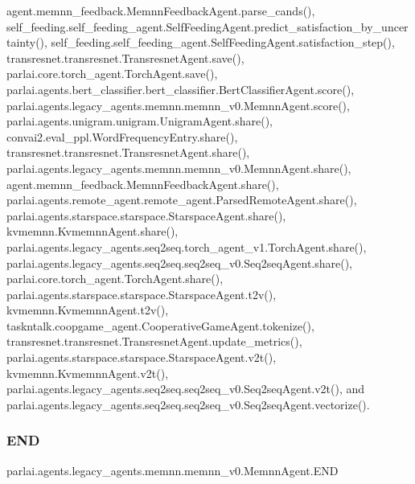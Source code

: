 agent.\+memnn\+\_\+feedback.\+Memnn\+Feedback\+Agent.\+parse\+\_\+cands(), self\+\_\+feeding.\+self\+\_\+feeding\+\_\+agent.\+Self\+Feeding\+Agent.\+predict\+\_\+satisfaction\+\_\+by\+\_\+uncertainty(), self\+\_\+feeding.\+self\+\_\+feeding\+\_\+agent.\+Self\+Feeding\+Agent.\+satisfaction\+\_\+step(), transresnet.\+transresnet.\+Transresnet\+Agent.\+save(), parlai.\+core.\+torch\+\_\+agent.\+Torch\+Agent.\+save(), parlai.\+agents.\+bert\+\_\+classifier.\+bert\+\_\+classifier.\+Bert\+Classifier\+Agent.\+score(), parlai.\+agents.\+legacy\+\_\+agents.\+memnn.\+memnn\+\_\+v0.\+Memnn\+Agent.\+score(), parlai.\+agents.\+unigram.\+unigram.\+Unigram\+Agent.\+share(), convai2.\+eval\+\_\+ppl.\+Word\+Frequency\+Entry.\+share(), transresnet.\+transresnet.\+Transresnet\+Agent.\+share(), parlai.\+agents.\+legacy\+\_\+agents.\+memnn.\+memnn\+\_\+v0.\+Memnn\+Agent.\+share(), agent.\+memnn\+\_\+feedback.\+Memnn\+Feedback\+Agent.\+share(), parlai.\+agents.\+remote\+\_\+agent.\+remote\+\_\+agent.\+Parsed\+Remote\+Agent.\+share(), parlai.\+agents.\+starspace.\+starspace.\+Starspace\+Agent.\+share(), kvmemnn.\+Kvmemnn\+Agent.\+share(), parlai.\+agents.\+legacy\+\_\+agents.\+seq2seq.\+torch\+\_\+agent\+\_\+v1.\+Torch\+Agent.\+share(), parlai.\+agents.\+legacy\+\_\+agents.\+seq2seq.\+seq2seq\+\_\+v0.\+Seq2seq\+Agent.\+share(), parlai.\+core.\+torch\+\_\+agent.\+Torch\+Agent.\+share(), parlai.\+agents.\+starspace.\+starspace.\+Starspace\+Agent.\+t2v(), kvmemnn.\+Kvmemnn\+Agent.\+t2v(), taskntalk.\+coopgame\+\_\+agent.\+Cooperative\+Game\+Agent.\+tokenize(), transresnet.\+transresnet.\+Transresnet\+Agent.\+update\+\_\+metrics(), parlai.\+agents.\+starspace.\+starspace.\+Starspace\+Agent.\+v2t(), kvmemnn.\+Kvmemnn\+Agent.\+v2t(), parlai.\+agents.\+legacy\+\_\+agents.\+seq2seq.\+seq2seq\+\_\+v0.\+Seq2seq\+Agent.\+v2t(), and parlai.\+agents.\+legacy\+\_\+agents.\+seq2seq.\+seq2seq\+\_\+v0.\+Seq2seq\+Agent.\+vectorize().

\mbox{\label{classparlai_1_1agents_1_1legacy__agents_1_1memnn_1_1memnn__v0_1_1MemnnAgent_ab4d3e5b627338f308b853d9a61aec2f0}} 
\subsubsection{\texorpdfstring{E\+ND}{END}}
{\footnotesize\ttfamily parlai.\+agents.\+legacy\+\_\+agents.\+memnn.\+memnn\+\_\+v0.\+Memnn\+Agent.\+E\+ND}



